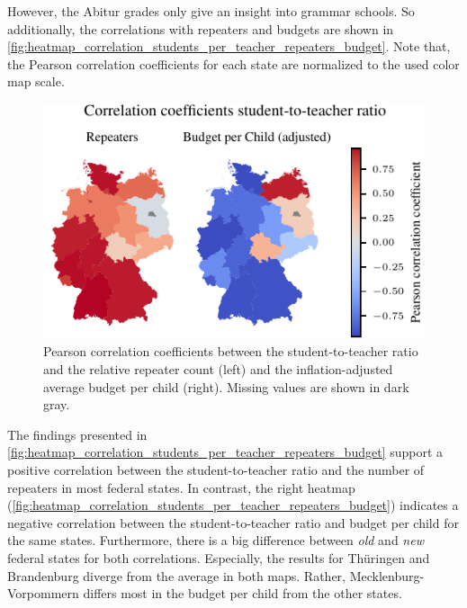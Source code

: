 However, the Abitur grades only give an insight into grammar schools. So additionally, the correlations with repeaters and budgets are shown in \autoref{fig:heatmap_correlation_students_per_teacher_repeaters_budget}. Note that, the Pearson correlation coefficients for each state are normalized to the used color map scale.

\begin{figure}[ht]
    \centering
    \includegraphics{fig/fig_heatmap_correlation_students_per_teacher_repeaters_budget.pdf}
    \caption{Pearson correlation coefficients between the student-to-teacher ratio and the relative repeater count (left) and the inflation-adjusted average budget per child (right). Missing values are shown in \textcolor{TUdark}{dark gray}.}
    \label{fig:heatmap_correlation_students_per_teacher_repeaters_budget}
\end{figure}

The findings presented in \autoref{fig:heatmap_correlation_students_per_teacher_repeaters_budget} support a  positive correlation between the student-to-teacher ratio and the number of repeaters in most federal states. In contrast, the right heatmap (\autoref{fig:heatmap_correlation_students_per_teacher_repeaters_budget}) indicates a negative correlation between the student-to-teacher ratio  and budget per child for the same states. Furthermore, there is a big difference between \emph{old} and \emph{new} federal states for both correlations. Especially, the results for Thüringen and Brandenburg diverge from the average in both maps. Rather, Mecklenburg-Vorpommern differs most in the budget per child from the other states.

